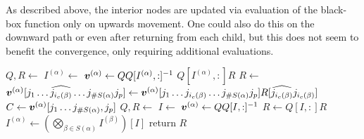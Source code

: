 \documentclass[a4wide]{article}
\begin{document}
\begin{remark}
  As described above, the interior nodes are updated via evaluation of the black-box
  function only on upwards movement.
  One could also do this on the downward path or even after returning from each child,
  but this does not seem to benefit the convergence, only requiring additional evaluations.
\end{remark}

\begin{algorithm}
\caption{Initialization for tree-cross algorithm}
\begin{algorithmic}[1]
    \State $Q, R \leftarrow $ 
    \State $I^{(\alpha)} \leftarrow $ 
    \State ${\boldsymbol{v}}^{(\alpha)} \leftarrow Q Q[I^{(\alpha)}, :]^{-1}$
    \State \Return $Q[I^{(\alpha)}, :] R$
  \Else
      \State $R  \leftarrow $ 
      \State $ {\boldsymbol{v}}^{(\alpha)}[j_1 \dots \widehat{j_{i_c(\beta)}} \dots j_{\# S(\alpha)} j_p]
      \leftarrow {\boldsymbol{v}}^{(\alpha)} [j_1 \dots j_{i_c(\beta)} \dots j_{\# S(\alpha)} j_p] R[\widehat{j_{i_c(\beta)}} j_{i_c(\beta)}]$
      \Statex {}
    \EndFor
      \State $C
      \leftarrow {\boldsymbol{v}}^{(\alpha)}[j_1 \dots j_{\# S(\alpha)}, j_p]$
      \State $Q, R \leftarrow$ 
      \State $I \leftarrow $ 
      \State ${\boldsymbol{v}}^{(\alpha)} \leftarrow Q Q[I, :]^{-1}$
      \State $R \leftarrow Q[I, :] R$
      \State $I^{(\alpha)} \leftarrow \left(\bigotimes_{\beta \in S(\alpha)} I^{(\beta)} \right) [I]$
      \State return $R$
    \EndIf
  \EndIf
\EndProcedure
\end{algorithmic}
\end{algorithm}
\end{document}
